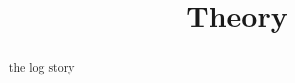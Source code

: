 \documentclass{ximera}
\title{Theory}
\begin{document}
\begin{abstract}
the log story
\end{abstract}
\maketitle
\end{document}
